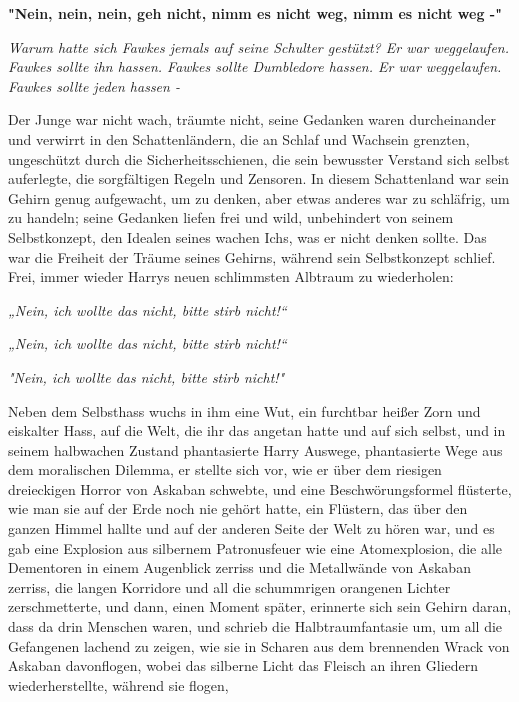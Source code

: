 {\hfill\break

\textbf{"Nein, nein, nein, geh nicht, nimm es nicht weg, nimm es nicht weg -"}

\emph{Warum hatte sich Fawkes jemals auf seine Schulter gestützt? Er war weggelaufen. Fawkes sollte ihn hassen. Fawkes sollte Dumbledore hassen. Er war weggelaufen. Fawkes sollte jeden hassen -}

Der Junge war nicht wach, träumte nicht, seine Gedanken waren durcheinander und verwirrt in den Schattenländern, die an Schlaf und Wachsein grenzten, ungeschützt durch die Sicherheitsschienen, die sein bewusster Verstand sich selbst auferlegte, die sorgfältigen Regeln und Zensoren. In diesem Schattenland war sein Gehirn genug aufgewacht, um zu denken, aber etwas anderes war zu schläfrig, um zu handeln; seine Gedanken liefen frei und wild, unbehindert von seinem Selbstkonzept, den Idealen seines wachen Ichs, was er nicht denken sollte. Das war die Freiheit der Träume seines Gehirns, während sein Selbstkonzept schlief. Frei, immer wieder Harrys neuen schlimmsten Albtraum zu wiederholen:

\emph{„Nein, ich wollte das nicht, bitte stirb nicht!“}

\hfill\break

\emph{„Nein, ich wollte das nicht, bitte stirb nicht!“}

\hfill\break

\emph{"Nein, ich wollte das nicht, bitte stirb nicht!"}

Neben dem Selbsthass wuchs in ihm eine Wut, ein furchtbar heißer Zorn und eiskalter Hass, auf die Welt, die ihr das angetan hatte und auf sich selbst, und in seinem halbwachen Zustand phantasierte Harry Auswege, phantasierte Wege aus dem moralischen Dilemma, er stellte sich vor, wie er über dem riesigen dreieckigen Horror von Askaban schwebte, und eine Beschwörungsformel flüsterte, wie man sie auf der Erde noch nie gehört hatte, ein Flüstern, das über den ganzen Himmel hallte und auf der anderen Seite der Welt zu hören war, und es gab eine Explosion aus silbernem Patronusfeuer wie eine Atomexplosion, die alle Dementoren in einem Augenblick zerriss und die Metallwände von Askaban zerriss, die langen Korridore und all die schummrigen orangenen Lichter zerschmetterte, und dann, einen Moment später, erinnerte sich sein Gehirn daran, dass da drin Menschen waren, und schrieb die Halbtraumfantasie um, um all die Gefangenen lachend zu zeigen, wie sie in Scharen aus dem brennenden Wrack von Askaban davonflogen, wobei das silberne Licht das Fleisch an ihren Gliedern wiederherstellte, während sie flogen,

}
